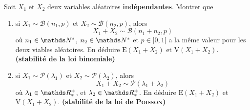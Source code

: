 \begin{exo}
	\begin{slshape}
		Soit $X_1$ et $X_2$ deux variables aléatoires \textbf{indépendantes}. Montrer que
		\begin{enumerate}
			\item si $X_1 \sim \mathcal{B}(n_1, p)$ et $X_2 \sim \mathcal{B}(n_2, p)$, alors \[
					X_1 + X_2 \sim \mathcal{B}(n_1 + n_2, p)
				\] où $n_1 \in \N^*$, $n_2 \in \N^*$ et $p \in {]0,1[}$ a la même valeur pour les deux viables aléatoires. En déduire $\mathrm{E}(X_1 + X_2)$ et $\mathrm{V}(X_1 + X_2)$. \hfill \textbf{(stabilité de la loi binomiale)}
			\item si $X_1 \sim \mathcal{P}(\lambda_1)$ et $X_2 \sim \mathcal{P}(\lambda_2)$, alors \[
					X_1 + X_2 \sim \mathcal{P}(\lambda_1 + \lambda_2)
				\] où $\lambda_1 \in \R^+_*$, et $\lambda_2 \in \R^+_*$. En déduire $\mathrm{E}(X_1 + X_2)$ et $\mathrm{V}(X_1 + X_2)$. \hfill \textbf{(stabilité de la loi de \textsc{Poisson})}
		\end{enumerate}
	\end{slshape}


\end{exo}
